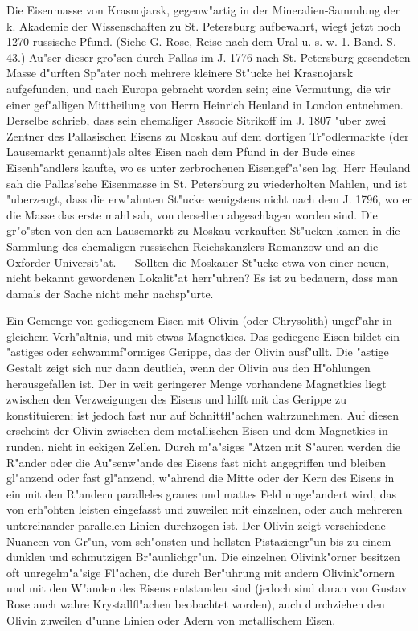 \documentclass[a4paper, 11pt, oneside, polutonikogreek, german]{article}
\begin{document}
{\footnotesize Die Eisenmasse von Krasnojarsk, gegenw"artig in der Mineralien-Sammlung der k. Akademie der Wissenschaften zu St. Petersburg aufbewahrt, wiegt jetzt noch 1270 russische Pfund. (Siehe G. Rose, Reise nach dem Ural u. s. w. 1. Band. S. 43.) Au"ser dieser gro"sen durch Pallas im J. 1776 nach St. Petersburg gesendeten Masse d"urften Sp"ater noch mehrere kleinere St"ucke hei Krasnojarsk aufgefunden, und nach Europa gebracht worden sein; eine Vermutung, die wir einer gef"alligen Mittheilung von Herrn Heinrich Heuland in London entnehmen. Derselbe schrieb, dass sein ehemaliger Associe Sitrikoff im J. 1807 "uber zwei Zentner des Pallasischen Eisens zu Moskau auf dem dortigen Tr"odlermarkte (der Lausemarkt genannt)als altes Eisen nach dem Pfund in der Bude eines Eisenh"andlers kaufte, wo es unter zerbrochenen Eisengef"a"sen lag. Herr Heuland sah die Pallas'sche Eisenmasse in St. Petersburg zu wiederholten Mahlen, und ist "uberzeugt, dass die erw"ahnten St"ucke wenigstens nicht nach dem J. 1796, wo er die Masse das erste mahl sah, von derselben abgeschlagen worden sind. Die gr"o"sten von den am Lausemarkt zu Moskau verkauften St"ucken kamen in die Sammlung des ehemaligen russischen Reichskanzlers Romanzow und an die Oxforder Universit"at. --- Sollten die Moskauer St"ucke etwa von einer neuen, nicht bekannt gewordenen Lokalit"at herr"uhren? Es ist zu bedauern, dass man damals der Sache nicht mehr nachsp"urte.}

\setlength{\leftskip}{0pt}
\setlength{\parindent}{20pt}

Ein Gemenge von gediegenem Eisen mit Olivin (oder Chrysolith) ungef"ahr in gleichem Verh"altnis, und mit etwas Magnetkies. Das gediegene Eisen bildet ein "astiges oder schwammf"ormiges Gerippe, das der Olivin ausf"ullt. Die "astige Gestalt zeigt sich nur dann deutlich, wenn der Olivin aus den H"ohlungen herausgefallen ist. Der in weit geringerer Menge vorhandene Magnetkies liegt zwischen den Verzweigungen des Eisens und hilft mit das Gerippe zu konstituieren; ist jedoch fast nur auf Schnittfl"achen wahrzunehmen. Auf diesen erscheint der Olivin zwischen dem metallischen Eisen und dem Magnetkies in runden, nicht in eckigen Zellen. Durch m"a"siges "Atzen mit S"auren werden die R"ander oder die Au"senw"ande des Eisens fast nicht angegriffen und bleiben gl"anzend oder fast gl"anzend, w"ahrend die Mitte oder der Kern des Eisens in ein mit den R"andern paralleles graues und mattes Feld umge"andert wird, das von erh"ohten leisten eingefasst und zuweilen mit einzelnen, oder auch mehreren untereinander parallelen Linien durchzogen ist. Der Olivin zeigt verschiedene Nuancen von Gr"un, vom sch"onsten und hellsten Pistaziengr"un bis zu einem dunklen und schmutzigen Br"aunlichgr"un. Die einzelnen Olivink"orner besitzen oft unregelm"a"sige Fl"achen, die durch Ber"uhrung mit andern Olivink"ornern und mit den W"anden des Eisens entstanden sind (jedoch sind daran von Gustav Rose auch wahre Krystallfl"achen beobachtet worden), auch durchziehen den Olivin zuweilen d"unne Linien oder Adern von metallischem Eisen.
\end{document}

